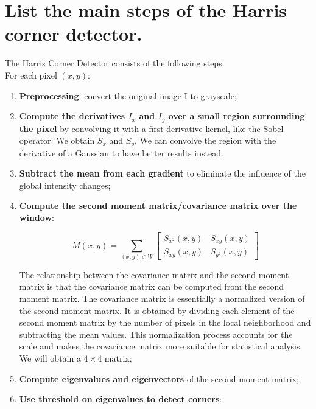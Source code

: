\documentclass{article}
\begin{document}
\newpage

\section*{List the main steps of the Harris corner detector.}

The Harris Corner Detector consists of the following steps. \\

For each pixel $(x, y)$:
\begin{enumerate}[start=0]
    \item \textbf{Preprocessing}: convert the original image I to grayscale;
    \item \textbf{Compute the derivatives $I_x$ and $I_y$ over a small region surrounding the pixel} by convolving it with a first derivative kernel, like the Sobel operator. We obtain $S_x$ and $S_y$. We can convolve the region with the derivative of a Gaussian to have better results instead.
    \item \textbf{Subtract the mean from each gradient} to eliminate the influence of the global intensity changes;
    \item \textbf{Compute the second moment matrix/covariance matrix over the window}: 
    \begin{center}
            \begin{equation*}
                M(x,y) = \sum_{(x,y) \in W}
                \begin{bmatrix}
                S_{x^2}(x,y) & S_{xy}(x,y) \\
                S_{xy}(x,y) & S_{y^2}(x,y)
                \end{bmatrix}
            \end{equation*}
    \end{center}
    The relationship between the covariance matrix and the second moment matrix is that the covariance matrix can be computed from the second moment matrix. The covariance matrix is essentially a normalized version of the second moment matrix. It is obtained by dividing each element of the second moment matrix by the number of pixels in the local neighborhood and subtracting the mean values. This normalization process accounts for the scale and makes the covariance matrix more suitable for statistical analysis.
    We will obtain a $4\times4$ matrix;
    \item \textbf{Compute eigenvalues and eigenvectors} of the second moment matrix;
    \item \textbf{Use threshold on eigenvalues to detect corners}:

\end{enumerate}
\end{document}
